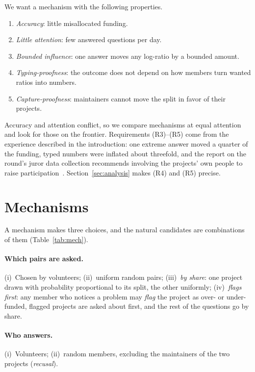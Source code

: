 \documentclass[doubleblind]{ecai}
\theoremstyle{remark}
\begin{document}
We want a mechanism with the following properties.
\begin{enumerate}[leftmargin=*,nosep,label=(R\arabic*)]
\item \emph{Accuracy}: little misallocated funding.
\item \emph{Little attention}: few answered questions per day.
\item \emph{Bounded influence}: one answer moves any log-ratio by a bounded amount.
\item \emph{Typing-proofness}: the outcome does not depend on how members turn wanted ratios into numbers.
\item \emph{Capture-proofness}: maintainers cannot move the split in favor of their projects.
\end{enumerate}
Accuracy and attention conflict, so we compare mechanisms at equal attention and look for those on the frontier. Requirements (R3)--(R5) come from the experience described in the introduction: one extreme answer moved a quarter of the funding, typed numbers were inflated about threefold, and the report on the round's juror data collection recommends involving the projects' own people to raise participation~\cite{niemerg2026verdict}. Section~\ref{sec:analysis} makes (R4) and (R5) precise.

\section{Mechanisms}\label{sec:mech}

A mechanism makes three choices, and the natural candidates are combinations of them (Table~\ref{tab:mech}).

\paragraph{Which pairs are asked.}
(i)~Chosen by volunteers; (ii)~uniform random pairs; (iii)~\emph{by share}: one project drawn with probability proportional to its split, the other uniformly; (iv)~\emph{flags first}: any member who notices a problem may \emph{flag} the project as over- or under-funded, flagged projects are asked about first, and the rest of the questions go by share.

\paragraph{Who answers.}
(i)~Volunteers; (ii)~random members, excluding the maintainers of the two projects (\emph{recusal}).
\end{document}

